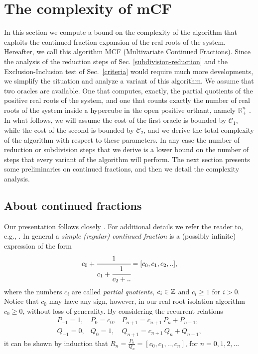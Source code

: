 \documentclass{sig-alternate}
\newcommand{\dott}{{..}}
\def\RR{\mathbb{R}}
\begin{document}
\section{The complexity of  mCF} 
\label{sec:complexity}

In this section we compute a bound on the complexity of the algorithm
that exploits the continued fraction expansion of the real roots of
the system.  Hereafter, we call this algorithm MCF (Multivariate
Continued Fractions).  Since the analysis of the reduction steps of
Sec. \ref{subdivision-reduction} and the Exclusion-Inclusion test of
Sec.~\ref{criteria} would require much more developments, we simplify
the situation and analyze a variant of this algorithm. We assume that
two oracles are available. One that computes, exactly, the partial
quotients of the positive real roots of the system, and one that
counts exactly the number of real roots of the system inside a
hypercube in the open positive orthant, namely $\RR_+^n$ . In what
follows, we will assume the cost of the first oracle is bounded by
$\mathcal{C}_1$, while the cost of the second is bounded by
$\mathcal{C}_2$, and we derive the total complexity of the algorithm
with respect to these parameters.  In any case the number of reduction
or subdivision steps that we derive is a lower bound on the number of
steps that every variant of the algorithm will perform. The next
section presents some preliminaries on continued fractions, and then
we detail the complexity analysis.


\subsection{About continued fractions}

Our presentation follows closely \cite{emt-lncs-2006}.
For additional details we refer the reader to, e.g., \cite{Yap2000,BomPoo:contfrac:95,Poorten:intro}.
In general a {\em simple (regular) continued fraction} 
is a (possibly infinite)  expression of the form 
\begin{displaymath}
  c_0 +
  \cfrac{1}{
    c_1 + \cfrac{1}{
      c_2 + \dott  }
  } =
  [ c_0, c_1, c_2, \dott ],
\end{displaymath}
where the numbers $c_i$ are called {\em partial quotients}, 
$c_i \in {\mathbb Z}$ and $c_i \geq 1$ for $i > 0$.  
Notice that $c_0$ may have any sign, however, in our real root isolation
algorithm $c_0 \geq 0$, without loss of generality.
By considering the recurrent relations
\begin{displaymath}
  \begin{array}{cccc}
    P_{-1} = 1, & P_{0} = c_0, & P_{n+1} = c_{n+1}\, P_{n} + P_{n-1},\\
    Q_{-1} = 0, & Q_{0} = 1,   & Q_{n+1} = c_{n+1}\, Q_{n} + Q_{n-1},
  \end{array}
\end{displaymath}
it can be shown by induction that $R_n = \frac{P_n}{Q_n} = [c_0, c_1, \dott, c_n]$,
for $n=0,1,2,\dott$.
\end{document}
